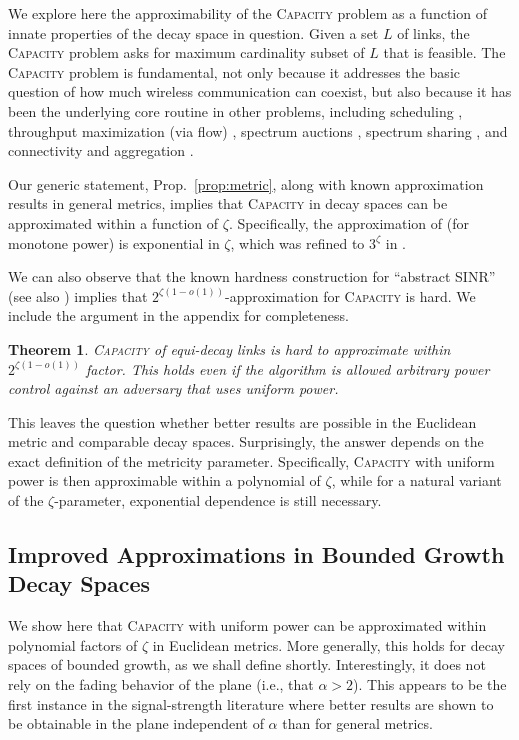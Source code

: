 \documentclass[11pt]{amsart}
\newcounter{foo}
\newtheorem{theorem}[foo]{Theorem}
\newcommand{\prob}[1]{\textsc{#1}}
\newcommand{\Capacity}{\prob{Capacity}}
\newcommand{\capacity}{\Capacity}
\begin{document}
We explore here the approximability of the {\capacity} problem as a
function of innate properties of the decay space in question.
Given a set $L$ of links, the {\capacity} problem asks for 
maximum cardinality subset
of $L$ that is feasible.
The {\capacity} problem is fundamental, not only because it addresses
the basic question of how much wireless communication
can coexist, but also because it has been the underlying core routine
in other problems, including scheduling \cite{GHWW09}, throughput maximization (via
flow) \cite{wanwireless}, spectrum auctions \cite{hoeferspaa}, spectrum sharing \cite{us:Infocom12}, and connectivity and aggregation \cite{SODA12,PODC12}.

Our generic statement, Prop.~\ref{prop:metric}, along with known
approximation results \cite{SODA11,KesselheimESA12} in general metrics, 
implies that {\capacity} in decay spaces can be approximated
within a function of $\zeta$. Specifically, the
approximation of \cite{SODA11} (for monotone power) is exponential in $\zeta$, 
which was refined to $3^\zeta$ in \cite{us:ICDCS14}.

We can also observe that the known hardness construction for
``abstract SINR'' \cite{GHWW09} (see also \cite{SODA11}) implies that
$2^{\zeta(1-o(1))}$-approximation for {\capacity} is hard.  We include
the argument in the appendix for completeness.

\begin{theorem}
 \prob{Capacity} of equi-decay links is hard to approximate within $2^{\zeta(1-o(1))}$ factor.
This holds even if the algorithm is allowed 
arbitrary power control against an adversary that uses uniform power.
\label{thm:cap-hardness}
\end{theorem}

This leaves the question whether better results are possible in the
Euclidean metric and comparable decay spaces. 
Surprisingly, the answer depends on the exact definition of the
metricity parameter.
Specifically, {\capacity} with uniform power is then
approximable within a polynomial of $\zeta$, while for
a natural variant of the $\zeta$-parameter, exponential dependence
is still necessary.

\subsection{Improved Approximations in Bounded Growth Decay Spaces}
\label{sec:polya}

We show here that {\capacity} with uniform power can be approximated
within polynomial factors of $\zeta$ in Euclidean metrics.  More
generally, this holds for decay spaces of bounded growth, as we shall
define shortly.  Interestingly, it does not rely on the fading
behavior of the plane (i.e., that $\alpha > 2$). This appears to be
the first instance in the signal-strength literature where better
results are shown to be obtainable in the plane independent of
$\alpha$ than for general metrics.
\end{document}

